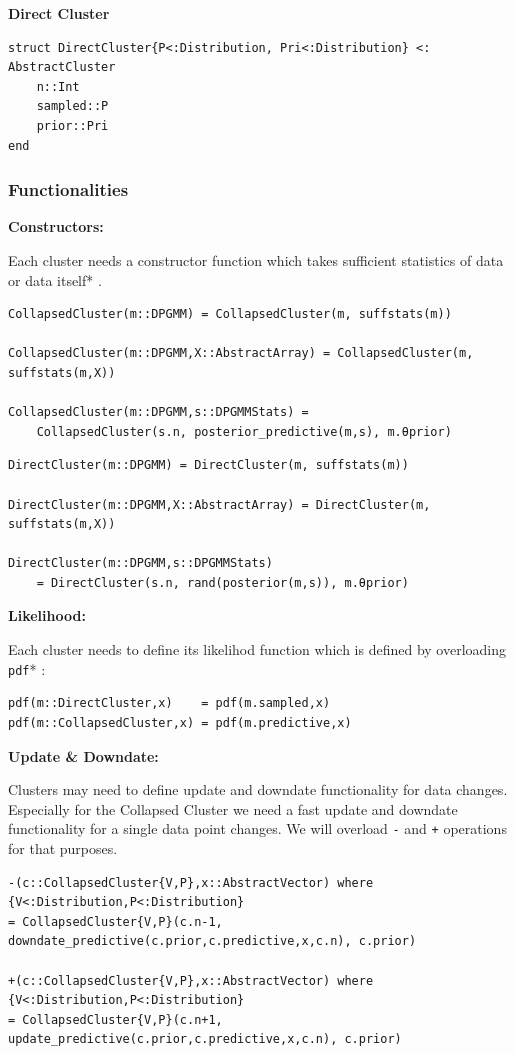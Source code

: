 \documentclass[a4paper]{article}
\begin{document}
\textbf{Direct Cluster}

\begin{lstlisting}
struct DirectCluster{P<:Distribution, Pri<:Distribution} <: AbstractCluster
    n::Int
    sampled::P
    prior::Pri
end
\end{lstlisting}


\subsubsection{Functionalities}

\textbf{Constructors:}

Each cluster needs a constructor function which takes sufficient
statistics of data or data itself* .
\begin{lstlisting}
CollapsedCluster(m::DPGMM) = CollapsedCluster(m, suffstats(m))

CollapsedCluster(m::DPGMM,X::AbstractArray) = CollapsedCluster(m, suffstats(m,X))

CollapsedCluster(m::DPGMM,s::DPGMMStats) = 
    CollapsedCluster(s.n, posterior_predictive(m,s), m.θprior)
\end{lstlisting}

\begin{lstlisting}
DirectCluster(m::DPGMM) = DirectCluster(m, suffstats(m))

DirectCluster(m::DPGMM,X::AbstractArray) = DirectCluster(m, suffstats(m,X))

DirectCluster(m::DPGMM,s::DPGMMStats) 
    = DirectCluster(s.n, rand(posterior(m,s)), m.θprior)
\end{lstlisting}

\textbf{Likelihood:}

Each cluster needs to define its likelihod function which is defined by
overloading \texttt{pdf}* :
\begin{lstlisting}
pdf(m::DirectCluster,x)    = pdf(m.sampled,x)
pdf(m::CollapsedCluster,x) = pdf(m.predictive,x)
\end{lstlisting}

\textbf{Update \& Downdate:}

Clusters may need to define update and downdate functionality for data
changes. Especially for the Collapsed Cluster we need a fast update and
downdate functionality for a single data point changes. We will overload
\texttt{-} and \texttt{+} operations for that purposes.
\begin{lstlisting}[linewidth=18cm]
-(c::CollapsedCluster{V,P},x::AbstractVector) where {V<:Distribution,P<:Distribution} 
= CollapsedCluster{V,P}(c.n-1, downdate_predictive(c.prior,c.predictive,x,c.n), c.prior)

+(c::CollapsedCluster{V,P},x::AbstractVector) where {V<:Distribution,P<:Distribution} 
= CollapsedCluster{V,P}(c.n+1, update_predictive(c.prior,c.predictive,x,c.n), c.prior)
\end{lstlisting}
\end{document}
